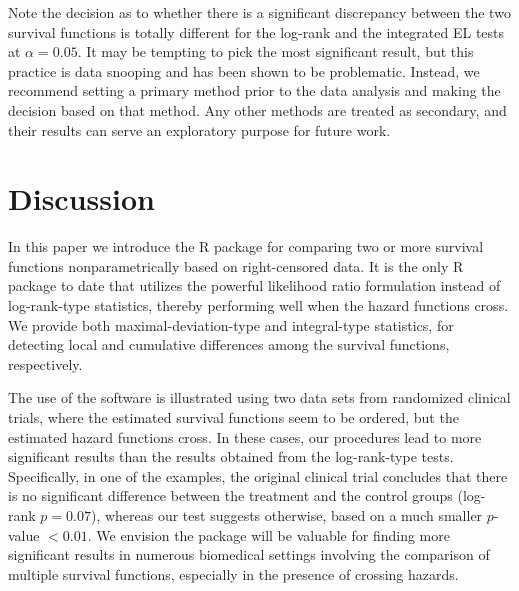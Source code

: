 Note the decision as to whether there is a significant discrepancy between the two survival functions is totally different for the log-rank and the integrated EL tests at $\alpha=0.05$. It may be tempting to pick the most significant result, but this practice is data snooping and has been shown to be problematic. 
Instead, we recommend setting a primary method prior to the data analysis and making the decision based on that method. Any other methods are treated as secondary, and their results can serve an exploratory purpose for future work. 


\section{Discussion}\label{sec:discussion}

In this paper we introduce the R package  for comparing two or more survival functions nonparametrically based on right-censored data. It is the only R package to date that utilizes the powerful likelihood ratio formulation instead of log-rank-type statistics, thereby performing well when the hazard functions cross.
We provide both maximal-deviation-type and integral-type statistics, for detecting local and cumulative differences among the survival functions, respectively.

The use of the software is illustrated using two data sets from randomized clinical trials, where the estimated survival functions seem to be ordered, but the estimated hazard functions cross. In these cases, our procedures lead to more significant results than the results obtained from the log-rank-type tests. Specifically, in one of the examples, the original clinical trial concludes that there is no significant difference between the treatment and the control groups (log-rank $p=0.07$), whereas our test suggests otherwise, based on a much smaller $p$-value $<0.01$.
We envision the  package will be valuable for finding more significant results in numerous biomedical settings involving the comparison of multiple survival functions, especially in the presence of crossing hazards.



